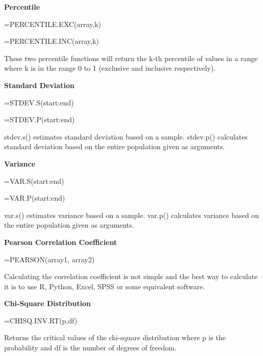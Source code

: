 \documentclass[
]{book}
\begin{document}
\textbf{Percentile}

=PERCENTILE.EXC(array,k)

=PERCENTILE.INC(array,k)

These two percentile functions will return the k-th percentile of values in a range where k is in the range 0 to 1 (exclusive and inclusive respectively).

\textbf{Standard Deviation}

=STDEV.S(start:end)

=STDEV.P(start:end)

stdev.s() estimates standard deviation based on a sample. stdev.p() calculates standard deviation based on the entire population given as arguments.

\textbf{Variance}

=VAR.S(start:end)

=VAR.P(start:end)

var.s() estimates variance based on a sample. var.p() calculates variance based on the entire population given as arguments.

\textbf{Pearson Correlation Coefficient}

=PEARSON(array1, array2)

Calculating the correlation coefficient is not simple and the best way to calculate it is to use R, Python, Excel, SPSS or some equivalent software.

\textbf{Chi-Square Distribution}

=CHISQ.INV.RT(p,df)

Returns the critical values of the chi-square distribution where p is the probability and df is the number of degrees of freedom.

  
\end{document}
